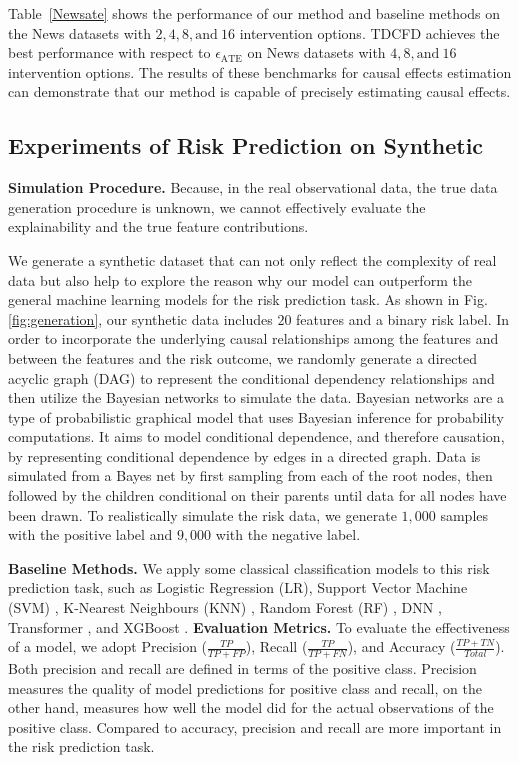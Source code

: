 \documentclass[letterpaper]{article} %
\theoremstyle{definition}
\theoremstyle{remark}
\begin{document}
Table~\ref{Newsate} shows the performance of our method and baseline methods on the News datasets with $2, 4, 8, \text{and} \ 16$ intervention options. TDCFD achieves the best performance with respect to $\epsilon_\text{ATE}$ on News datasets with $4, 8, \text{and} \ 16$ intervention options. The results of these benchmarks for causal effects estimation can demonstrate that our method is capable of precisely estimating causal effects.


\subsection{Experiments of Risk Prediction on Synthetic}




\noindent\textbf{Simulation Procedure.}
Because, in the real observational data, the true data generation procedure is unknown, we cannot effectively evaluate the explainability and the true feature contributions.

We generate a synthetic dataset that can not only reflect the complexity of real data but also help to explore the reason why our model can outperform the general machine learning models for the risk prediction task. As shown in Fig. \ref{fig:generation}, our synthetic data includes $20$ features and a binary risk label. In order to incorporate the underlying causal relationships among the features and between the features and the risk outcome, we randomly generate a directed acyclic graph (DAG) to represent the conditional dependency relationships and then utilize the Bayesian networks \cite{heckerman2008tutorial} to simulate the data. Bayesian networks are a type of probabilistic graphical model that uses Bayesian inference for probability computations. It aims to model conditional dependence, and therefore causation, by representing conditional dependence by edges in a directed graph. Data is simulated from a Bayes net by first sampling from each of the root nodes, then followed by the children conditional on their parents until data for all nodes have been drawn. To realistically simulate the risk data, we generate $1,000$ samples with the positive label and $9,000$ with the negative label.


\noindent\textbf{Baseline Methods.} We apply some classical classification models to this risk prediction task, such as Logistic Regression (LR), Support Vector Machine (SVM) \cite{suykens1999least}, K-Nearest Neighbours (KNN) \cite{cunningham2021k}, Random Forest (RF) \cite{breiman2001random}, DNN \cite{larochelle2009exploring}, Transformer \cite{vaswani2017attention}, and XGBoost \cite{chen2016xgboost}.  \noindent\textbf{Evaluation Metrics.}
To evaluate the effectiveness of a model, we adopt Precision ($\frac{TP}{TP+FP}$), Recall ($\frac{TP}{TP+FN}$), and Accuracy ($\frac{TP+TN}{Total}$). Both precision and recall are defined in terms of the positive class. Precision measures the quality of model predictions for positive class and recall, on the other hand, measures how well the model did for the actual observations of the positive class. Compared to accuracy, precision and recall are more important in the risk prediction task.
\end{document}
